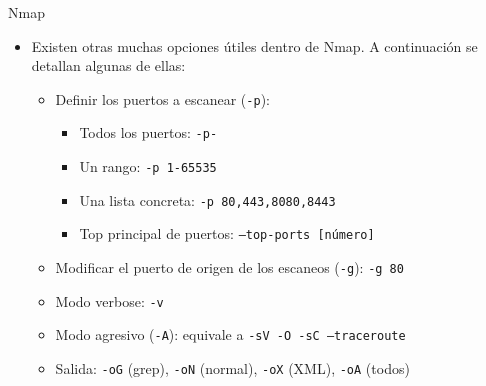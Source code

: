 \documentclass[aspectratio=169,11pt]{beamer}
\newcommand{\cmd}[1]{\texttt{\color{uznavy}#1}}
\begin{document}
\begin{frame}{Nmap}
\small
  \begin{itemize}
  \item Existen otras muchas opciones útiles dentro de Nmap. A continuación se detallan algunas de ellas:
    \begin{itemize}
    \item Definir los puertos a escanear (\cmd{-p}):
      \begin{itemize}
      \item Todos los puertos: \cmd{-p-}
      \item Un rango: \cmd{-p 1-65535}
      \item Una lista concreta: \cmd{-p 80,443,8080,8443}
      \item Top principal de puertos: \cmd{--top-ports [número]}
      \end{itemize}
    \item Modificar el puerto de origen de los escaneos (\cmd{-g}): \cmd{-g 80}
    \item Modo verbose: \cmd{-v}
    \item Modo agresivo (\cmd{-A}): equivale a \cmd{-sV -O -sC --traceroute}
    \item Salida: \cmd{-oG} (grep), \cmd{-oN} (normal), \cmd{-oX} (XML), \cmd{-oA} (todos)
    \end{itemize}
  \end{itemize}
\end{frame}
\end{document}
